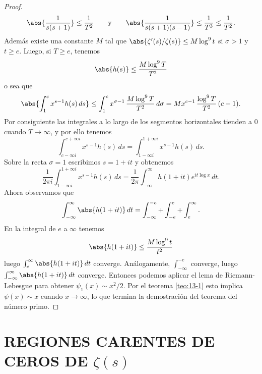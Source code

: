 \begin{proof}
        \begin{equation*}
            \abs{\frac{1}{s(s+1)}}\leq\frac{1}{T^2}\qquad\text{y}\qquad\abs{\frac{1}{s(s+1)(s-1)}}\leq\frac{1}{T^3}\leq\frac{1}{T^2}.
        \end{equation*}
        Además existe una constante $M$ tal que $\abs{\zeta'(s)/\zeta(s)}\leq M\log^9t$ si
        $\sigma>1$ y $t\geq e$. Luego, si $T\geq e$, tenemos
        \begin{equation*}
            \abs{h(s)}\leq\frac{M\log^9T}{T^2}
        \end{equation*}
        o sea que
        \begin{equation*}
            \abs{\int_1^cx^{s-1}h(s)\,ds}\leq\int_1^cx^{\sigma-1}\,\frac{M\log^9T}{T^2}\,d\sigma=Mx^{c-1}\,\frac{\log^9T}{T^2}\,(c-1).
        \end{equation*}
        Por consiguiente las integrales a lo largo de los segmentos horizontales tienden a 0
        cuando $T\to\infty$, y por ello tenemos
        \begin{equation*}
            \int_{c-\infty i}^{c+\infty i}x^{s-1}h(s)\,ds=\int_{1-\infty i}^{1+\infty i}x^{s-1}h(s)\,ds.
        \end{equation*}
        Sobre la recta $\sigma=1$ escribimos $s=1+it$ y obtenemos
        \begin{equation*}
            \frac{1}{2\pi i}\int_{1-\infty i}^{1+\infty i}x^{s-1}h(s)\,ds=\frac{1}{2\pi}\int_{-\infty}^{\infty}h(1+it)e^{it\log x}\,dt.
        \end{equation*}
        Ahora observamos que
        \begin{equation*}
            \int_{-\infty}^{\infty}\abs{h(1+it)}\,dt=\int_{-\infty}^{-e}+\int_{-e}^{e}+\int_e^{\infty}.
        \end{equation*}
        En la integral de $e$ a $\infty$ tenemos
        \begin{equation*}
            \abs{h(1+it)}\leq\frac{M\log^9t}{t^2}
        \end{equation*}
        luego $\int_e^{\infty}\abs{h(1+it)}\,dt$ converge. Análogamente, $\int_{-\infty}^{-e}$
        converge, luego $\int_{-\infty}^{\infty}\abs{h(1+it)}\,dt$ converge. Entonces podemos
        aplicar el lema de Riemann-Lebesgue para obtener $\psi_1(x)\sim x^2/2$. Por el teorema
        \ref{teo:13-1} esto implica $\psi(x)\sim x$ cuando $x\to\infty$, lo que termina la
        demostración del teorema del número primo.
    \end{proof}

    \section[REGIONES CARENTES DE CEROS DE $\zeta(s)$]{REGIONES CARENTES DE CEROS DE \texorpdfstring{$\zeta(s)$}{ζ(s)}}

